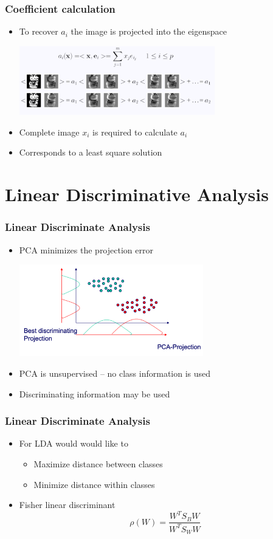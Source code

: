 \documentclass[10pt]{beamer}
\begin{document}
\begin{frame}
  \frametitle{Coefficient calculation}
  \begin{itemize}
  \item To recover $a_i$ the image is projected into the eigenspace
    \centerline{\includegraphics[height=3cm]{pca-calculation}}
  \item Complete image $x_i$ is required to calculate $a_i$
  \item Corresponds to a least square solution
  \end{itemize}
\end{frame}

\section{Linear Discriminative Analysis}
\label{sec:lda}

\begin{frame}
  \frametitle{Linear Discriminate Analysis}
  \begin{itemize}
  \item PCA minimizes the projection error
    \centerline{\includegraphics[height=4cm]{pca-projection}}
  \item PCA is unsupervised -- no class information is used
  \item Discriminating information may be used
  \end{itemize}
\end{frame}

\begin{frame}
  \frametitle{Linear Discriminate Analysis}
  \begin{itemize}
  \item For LDA would would like to
    \begin{itemize}
    \item Maximize distance between classes
    \item Minimize distance within classes
    \end{itemize}
  \item Fisher linear discriminant
    \[
      \rho (W) = \frac{W^T S_B W}{W^T S_W W}
    \]
  \end{itemize}
\end{frame}
\end{document}
